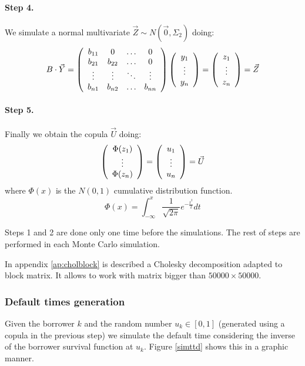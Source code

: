 \documentclass[a4paper,12pt,final]{article}
\begin{document}
\paragraph{Step 4.} We simulate a normal multivariate $\vec{Z} \sim N(\vec{0}, \Sigma_2)$ 
doing:
\begin{displaymath}
B \cdot \vec{Y} 
=
\left(
\begin{array}{cccc}
b_{11}   & 0        & \ldots & 0       \cr
b_{21}   & b_{22}   & \ldots & 0       \cr
\vdots  & \vdots  & \ddots & \vdots \cr
b_{n1}   & b_{n2}   & \ldots & b_{nn}
\end{array}
\right)
\left(
\begin{array}{c}
y_1 \cr
\vdots \cr
y_n
\end{array}
\right) 
=
\left(
\begin{array}{c}
z_1 \cr
\vdots \cr
z_n
\end{array}
\right) 
= 
\vec{Z}
\end{displaymath}

\paragraph{Step 5.} Finally we obtain the copula $\vec{U}$ doing:
\begin{displaymath}
\left(
\begin{array}{c}
\Phi(z_1) \cr
\vdots \cr
\Phi(z_n)
\end{array}
\right) 
=
\left(
\begin{array}{c}
u_1 \cr
\vdots \cr
u_n
\end{array}
\right) 
=
\vec{U} 
\end{displaymath}
where $\Phi(x)$ is the $N(0,1)$ cumulative distribution function.
\begin{displaymath}
\Phi(x) = \int_{-\infty}^{x} \frac{1}{\sqrt{2 \pi}} e^{-\frac{t^2}{2}} dt
\end{displaymath}

Steps 1 and 2 are done only one time before the simulations. The rest of steps
are performed in each Monte Carlo simulation.
\newline

In appendix \ref{ap:cholblock} is described a Cholesky decomposition adapted to 
block matrix. It allows to work with matrix bigger than $50000 \times 50000$.

\subsubsection{Default times generation}
Given the borrower $k$ and the random number $u_k \in [0,1]$ (generated using a 
copula in the previous step) we simulate the default time considering the 
inverse of the borrower survival function at $u_k$. Figure \ref{simttd} shows 
this in a graphic manner.
\end{document}
